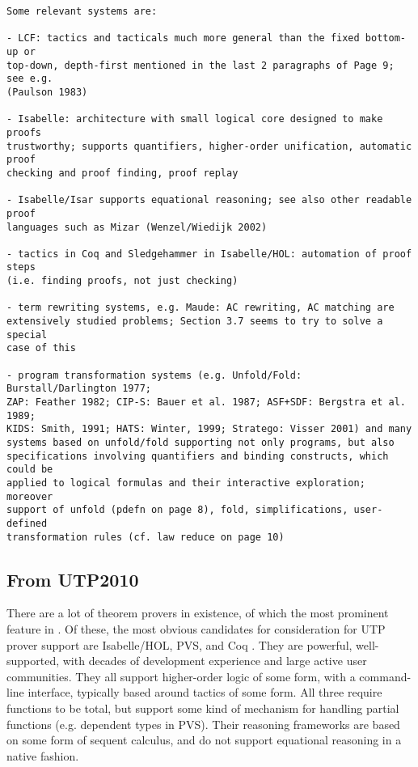 \begin{verbatim}
Some relevant systems are:

- LCF: tactics and tacticals much more general than the fixed bottom-up or
top-down, depth-first mentioned in the last 2 paragraphs of Page 9; see e.g.
(Paulson 1983)

- Isabelle: architecture with small logical core designed to make proofs
trustworthy; supports quantifiers, higher-order unification, automatic proof
checking and proof finding, proof replay

- Isabelle/Isar supports equational reasoning; see also other readable proof
languages such as Mizar (Wenzel/Wiedijk 2002)

- tactics in Coq and Sledgehammer in Isabelle/HOL: automation of proof steps
(i.e. finding proofs, not just checking)

- term rewriting systems, e.g. Maude: AC rewriting, AC matching are
extensively studied problems; Section 3.7 seems to try to solve a special
case of this

- program transformation systems (e.g. Unfold/Fold: Burstall/Darlington 1977;
ZAP: Feather 1982; CIP-S: Bauer et al. 1987; ASF+SDF: Bergstra et al. 1989;
KIDS: Smith, 1991; HATS: Winter, 1999; Stratego: Visser 2001) and many
systems based on unfold/fold supporting not only programs, but also
specifications involving quantifiers and binding constructs, which could be
applied to logical formulas and their interactive exploration; moreover
support of unfold (pdefn on page 8), fold, simplifications, user-defined
transformation rules (cf. law reduce on page 10)
\end{verbatim}

\subsection{From UTP2010}

There are a lot of theorem provers in existence,
of which the most prominent feature in \cite{conf/tphol/2006provers}.
Of these, the most obvious candidates for consideration for UTP prover support
are Isabelle/HOL\cite{books/sp/NipkowPW02},
PVS\cite{conf/fmcad/Shankar96},
and Coq \cite{bk:Coq'Art:04}.
They are powerful, well-supported,
with decades of development experience
and large active user communities.
They all support higher-order logic of some form, with a command-line interface,
typically based around tactics of some form. All three require functions to be total,
but support some kind of mechanism for handling partial functions
(e.g. dependent types in PVS).
Their reasoning frameworks are based on some form of sequent calculus,
and do not support equational reasoning in a native fashion.


